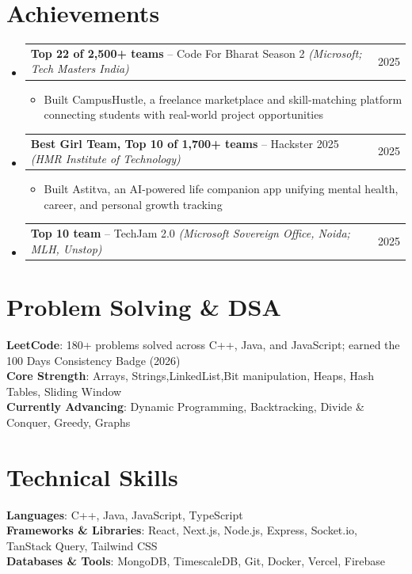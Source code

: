 \documentclass[letterpaper,11pt]{article}
\makeatletter
\newcommand{\resumeItem}[1]{
  \item\small{
    {#1 \vspace{1pt}}
  }
}
\newcommand{\resumeProjectHeading}[2]{
    \item
    \begin{tabular*}{0.97\textwidth}{l@{\extracolsep{\fill}}r}
      \small#1 & #2 \\
    \end{tabular*}\vspace{1pt}
}
\newcommand{\resumeSubHeadingListStart}{\begin{itemize}[leftmargin=0.15in, label={}]}
\newcommand{\resumeSubHeadingListEnd}{\end{itemize}}
\newcommand{\resumeItemListStart}{\begin{itemize}[leftmargin=0.15in, itemsep=1pt]}
\newcommand{\resumeItemListEnd}{\end{itemize}\vspace{4pt}}
\makeatother
\begin{document}
\section{Achievements}
    \resumeSubHeadingListStart
      \resumeProjectHeading
          {\textbf{Top 22 of 2,500+ teams} -- Code For Bharat Season 2 \emph{(Microsoft; Tech Masters India)}}{2025}
          \resumeItemListStart
            \resumeItem{Built CampusHustle, a freelance marketplace and skill-matching platform connecting students with real-world project opportunities}
          \resumeItemListEnd
      \resumeProjectHeading
          {\textbf{Best Girl Team, Top 10 of 1,700+ teams} -- Hackster 2025 \emph{(HMR Institute of Technology)}}{2025}
          \resumeItemListStart
            \resumeItem{Built Astitva, an AI-powered life companion app unifying mental health, career, and personal growth tracking}
          \resumeItemListEnd
      \resumeProjectHeading
          {\textbf{Top 10 team} -- TechJam 2.0 \emph{(Microsoft Sovereign Office, Noida; MLH, Unstop)}}{2025}
    \resumeSubHeadingListEnd

\section{Problem Solving \& DSA}
 \begin{itemize}[leftmargin=0.15in, label={}]
    \small{\item{
     \textbf{LeetCode}{: 180+ problems solved across C++, Java, and JavaScript; earned the 100 Days Consistency Badge (2026)} \\
     \textbf{Core Strength}{: Arrays, Strings,LinkedList,Bit manipulation, Heaps, Hash Tables, Sliding Window} \\
     \textbf{Currently Advancing}{: Dynamic Programming, Backtracking, Divide \& Conquer, Greedy, Graphs}
    }}
 \end{itemize}

\section{Technical Skills}
 \begin{itemize}[leftmargin=0.15in, label={}]
    \small{\item{
     \textbf{Languages}{: C++, Java, JavaScript, TypeScript} \\
     \textbf{Frameworks \& Libraries}{: React, Next.js, Node.js, Express, Socket.io, TanStack Query, Tailwind CSS} \\
     \textbf{Databases \& Tools}{: MongoDB, TimescaleDB, Git, Docker, Vercel, Firebase}
    }}
 \end{itemize}
\end{document}
